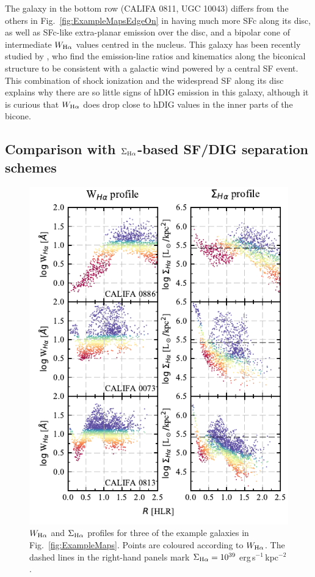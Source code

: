 \documentclass[a4paper, fleqn, usenatbib, useAMS]{mnras}
\newcommand{\Ha}{\ifmmode {\rm H}\alpha \else H$\alpha$\fi\xspace}
\begin{document}
The galaxy in the bottom row (CALIFA 0811, UGC 10043) differs from the others in Fig.\ \ref{fig:ExampleMapsEdgeOn} in having much more SFc along its disc, as well as SFc-like extra-planar emission over the disc, and a bipolar cone of intermediate $W_{\Ha}$ values centred in the nucleus. This galaxy has been recently studied by \citet{LopezCoba.etal.2017}, who find the emission-line ratios and kinematics along the biconical structure to be consistent with a galactic wind powered by a central SF event. This combination of shock ionization and the widespread SF along its disc explains why there are so little signs of hDIG emission in this galaxy, although it is curious that $W_{\Ha}$ does drop close to hDIG values in the inner parts of the bicone.

\subsection{Comparison with $\Sigma_{\Ha}$-based SF/DIG separation schemes}
\label{sec:SBHa}

\begin{figure}
 \includegraphics{figs/fig_WHaSBHa_profile_faceon_paper.pdf}
 \caption{
  $W_{\Ha}$ and $\Sigma_{\Ha}$ profiles for three of the example galaxies in Fig.\ \ref{fig:ExampleMaps}. Points are coloured according to $W_{\Ha}$. The dashed lines in the right-hand panels mark $\Sigma_{\Ha} = 10^{39}$ erg$\,$s$^{-1}\,$kpc$^{-2}$.
 }
 \label{fig:WHa_and_SHa_profiles}
\end{figure}
\end{document}
